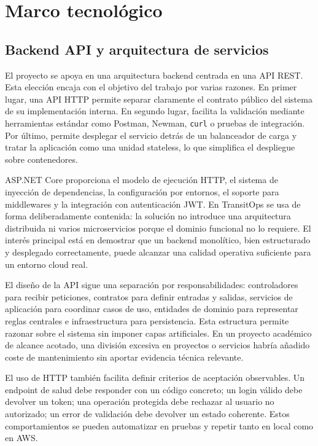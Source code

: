 \chapter{Marco tecnológico}
\label{chap:marco-tecnologico}

\section{Backend API y arquitectura de servicios}
\label{sec:marco-backend-api}

El proyecto se apoya en una arquitectura backend centrada en una API REST. Esta elección encaja con el objetivo del trabajo por varias razones. En primer lugar, una API HTTP permite separar claramente el contrato público del sistema de su implementación interna. En segundo lugar, facilita la validación mediante herramientas estándar como Postman, Newman, \texttt{curl} o pruebas de integración. Por último, permite desplegar el servicio detrás de un balanceador de carga y tratar la aplicación como una unidad \gls{stateless}, lo que simplifica el despliegue sobre contenedores.

ASP.NET Core proporciona el modelo de ejecución HTTP, el sistema de inyección de dependencias, la configuración por entornos, el soporte para middlewares y la integración con autenticación JWT. En TransitOps se usa de forma deliberadamente contenida: la solución no introduce una arquitectura distribuida ni varios microservicios porque el dominio funcional no lo requiere. El interés principal está en demostrar que un backend monolítico, bien estructurado y desplegado correctamente, puede alcanzar una calidad operativa suficiente para un entorno cloud real.

El diseño de la API sigue una separación por responsabilidades: controladores para recibir peticiones, contratos para definir entradas y salidas, servicios de aplicación para coordinar casos de uso, entidades de dominio para representar reglas centrales e infraestructura para persistencia. Esta estructura permite razonar sobre el sistema sin imponer capas artificiales. En un proyecto académico de alcance acotado, una división excesiva en proyectos o servicios habría añadido coste de mantenimiento sin aportar evidencia técnica relevante.

El uso de HTTP también facilita definir criterios de aceptación observables. Un endpoint de salud debe responder con un código concreto; un login válido debe devolver un token; una operación protegida debe rechazar al usuario no autorizado; un error de validación debe devolver un estado coherente. Estos comportamientos se pueden automatizar en pruebas y repetir tanto en local como en AWS.

